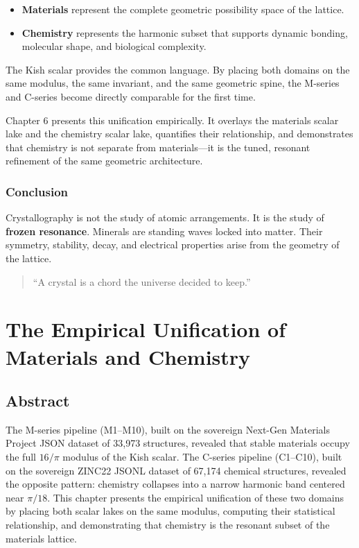 \documentclass[11pt, letterpaper, openany]{book}
\begin{document}
\begin{itemize}
    \item \textbf{Materials} represent the complete geometric possibility space of the lattice.
    \item \textbf{Chemistry} represents the harmonic subset that supports dynamic bonding, molecular shape, and biological complexity.
\end{itemize}

The Kish scalar provides the common language. By placing both domains on the same modulus, the same invariant, and the same geometric spine, the M-series and C-series become directly comparable for the first time.

Chapter 6 presents this unification empirically. It overlays the materials scalar lake and the chemistry scalar lake, quantifies their relationship, and demonstrates that chemistry is not separate from materials---it is the tuned, resonant refinement of the same geometric architecture.

\subsection*{Conclusion}

Crystallography is not the study of atomic arrangements. It is the study of \textbf{frozen
resonance}. Minerals are standing waves locked into matter. Their symmetry, stability,
decay, and electrical properties arise from the geometry of the lattice.

\begin{quote}
“A crystal is a chord the universe decided to keep.”
\end{quote}

\chapter{The Empirical Unification of Materials and Chemistry}

\section*{Abstract}

The M-series pipeline (M1--M10), built on the sovereign Next-Gen Materials Project JSON dataset
of 33,973 structures, revealed that stable materials occupy the full $16/\pi$ modulus of the Kish
scalar. The C-series pipeline (C1--C10), built on the sovereign ZINC22 JSONL dataset of 67,174
chemical structures, revealed the opposite pattern: chemistry collapses into a narrow harmonic band
centered near $\pi/18$. This chapter presents the empirical unification of these two domains by
placing both scalar lakes on the same modulus, computing their statistical relationship, and
demonstrating that chemistry is the resonant subset of the materials lattice.
\end{document}
